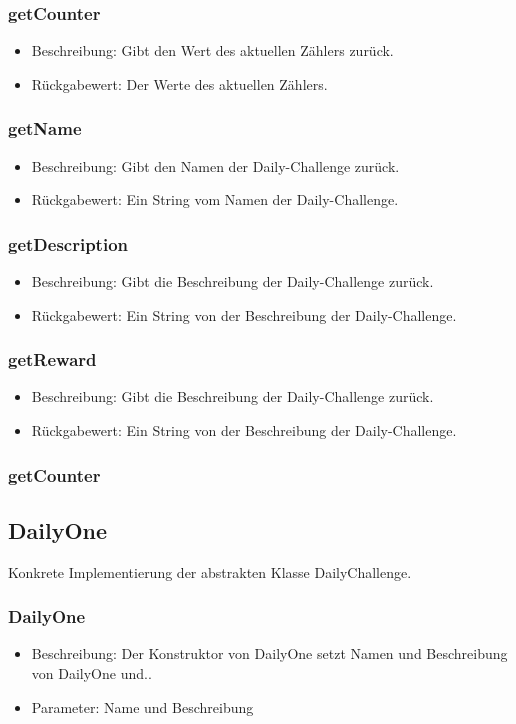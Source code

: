 \documentclass[a4paper]{scrreprt}
\begin{document}
   \subsubsection{getCounter}
   \begin{itemize}
     \item Beschreibung: Gibt den Wert des aktuellen Zählers zurück.
     \item Rückgabewert: Der Werte des aktuellen Zählers.
    \end{itemize}
   \subsubsection{getName}
   \begin{itemize}
     \item Beschreibung: Gibt den Namen der Daily-Challenge zurück.
     \item Rückgabewert: Ein String vom Namen der Daily-Challenge.
    \end{itemize}
   \subsubsection{getDescription}
   \begin{itemize}
     \item Beschreibung: Gibt die Beschreibung der Daily-Challenge zurück.
     \item Rückgabewert: Ein String von der Beschreibung der Daily-Challenge.
    \end{itemize}
   \subsubsection{getReward}
   \begin{itemize}
   \item Beschreibung: Gibt die Beschreibung der Daily-Challenge zurück.
   \item Rückgabewert: Ein String von der Beschreibung der Daily-Challenge.
   \end{itemize}
   \subsubsection{getCounter}
   
   \subsection{DailyOne}
   Konkrete Implementierung der abstrakten Klasse DailyChallenge.
   \subsubsection{DailyOne}
   \begin{itemize}
   	\item Beschreibung: Der Konstruktor von DailyOne setzt Namen und Beschreibung von DailyOne und..
   	\item Parameter: Name und Beschreibung 
   \end{itemize}
\end{document}
